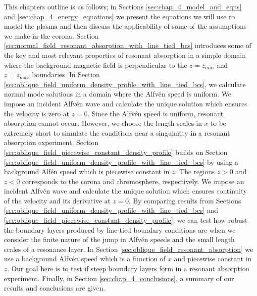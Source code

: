 This chapters outline is as follows; in Sections \ref{sec:chap_4_model_and_eqns} and \ref{sec:chap_4_energy_equations} we  present the equations we will use to model the plasma and then discuss the applicability of some of the assumptions we make in the corona. Section \ref{sec:normal_field_resonant_absorption_with_line_tied_bcs} introduces some of the key and most relevant properties of resonant absorption in a simple domain where the background magnetic field is perpendicular to the $z=z_{min}$ and $z=z_{max}$ boundaries. In Section \ref{sec:oblique_field_uniform_density_profile_with_line_tied_bcs}, we calculate normal mode solutions in a domain where the Alfv\'en speed is uniform. We impose an incident Alfv\'en wave and calculate the unique solution which ensures the velocity is zero at $z=0$. Since the Alfv\'en speed is uniform, resonant absorption cannot occur. However, we choose the length scales in $x$ to be extremely short to simulate the conditions near a singularity in a resonant absorption experiment. Section \ref{sec:oblique_field_piecewise_constant_density_profile} builds on Section \ref{sec:oblique_field_uniform_density_profile_with_line_tied_bcs} by using a background Alf\'en speed which is piecewise constant in $z$. The regions $z>0$ and $z<0$ corresponds to the corona and chromosphere, respectively. We impose an incident Alfv\'en wave and calculate the unique solution which ensures continuity of the velocity and its derivative at $z=0$. By comparing results from Sections \ref{sec:oblique_field_uniform_density_profile_with_line_tied_bcs} and \ref{sec:oblique_field_piecewise_constant_density_profile}, we can test how robust the boundary layers produced by line-tied boundary conditions are when we consider the finite nature of the jump in Alfv\'en speeds and the small length scales of a resonance layer. In Section \ref{sec:oblique_field_resonant_absorption} we use a background Alfv\'en speed which is a function of $x$ and piecewise constant in $z$. Our goal here is to test if steep boundary layers form in a resonant absorption experiment. Finally, in Section \ref{sec:chap_4_conclusions}, a summary of our results and conclusions are given.

